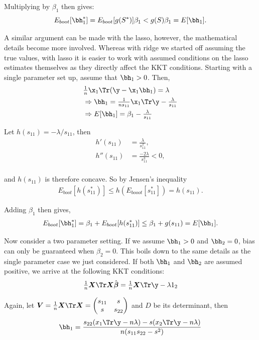 \noindent Multiplying by $\beta_1$ then gives:
$$
E_{boot}[\bh_1^*] = E_{boot}[g(S^*)]\beta_1 < g(S)\beta_1 = E[\bh_1].
$$

A similar argument can be made with the lasso, however, the mathematical details become more involved. Whereas with ridge we started off assuming the true values, with lasso it is easier to work with assumed conditions on the lasso estimates themselves as they directly affect the KKT conditions. Starting with a single parameter set up, assume that $\bh_1 > 0$. Then,
$$
\begin{aligned}
&\tfrac{1}{n}\x_1\Tr(\y - \x_1 \bh_1) = \lambda \\
&\Rightarrow \bh_1 = \tfrac{1}{ns_{11}}\x_1\Tr\y - \tfrac{\lambda}{s_{11}} \\
&\Rightarrow E[\bh_1] = \beta_1 - \tfrac{\lambda}{s_{11}} \\
\end{aligned}
$$

\noindent Let $h(s_{11}) = -\lambda / s_{11}$, then
$$
\begin{aligned}
h'(s_{11}) &= \tfrac{\lambda}{s_{11}^2}, \\
h''(s_{11}) &= \tfrac{-2\lambda}{s_{11}^3}  < 0,\\
\end{aligned}
$$

\noindent and $h(s_{11})$ is therefore concave. So by Jensen's inequality
$$
\begin{aligned}
E_{boot}[h(s_{11}^*)] \leq h(E_{booot}[s_{11}^*]) = h(s_{11}).
\end{aligned}
$$

\noindent Adding $\beta_1$ then gives,
$$
\begin{aligned}
E_{boot}[\bh_1^*] = \beta_1 + E_{boot}[h(s_{11}^*)] \leq \beta_1 + g(s_{11}) = E[\bh_1].
\end{aligned}
$$

Now consider a two parameter setting. If we assume $\bh_1 > 0$ and $\bh_2 = 0$, bias can only be guaranteed when $\beta_2 = 0$. This boils down to the same details as the single parameter case we just considered. If both $\bh_1$ and $\bh_2$ are assumed positive, we arrive at the following KKT conditions:
$$
\begin{aligned}
\tfrac{1}{n}\boldsymbol{X}\Tr\boldsymbol{X} \hat{\boldsymbol{\beta}} &= \tfrac{1}{n}\boldsymbol{X}\Tr \y - \lambda 1_2 \\
\end{aligned}
$$

\noindent Again, let $\boldsymbol{V} = \frac{1}{n}\boldsymbol{X}\Tr\boldsymbol{X} = \begin{pmatrix} s_{11} & s \\ s & s_{22} \end{pmatrix}$ and $D$ be its determinant, then
$$
\begin{aligned}
\bh_1 = \frac{s_{22}(x_1\Tr \y- n\lambda) - s(x_2\Tr \y- n\lambda)}{n(s_{11}s_{22} - s^2)}
\end{aligned}
$$

